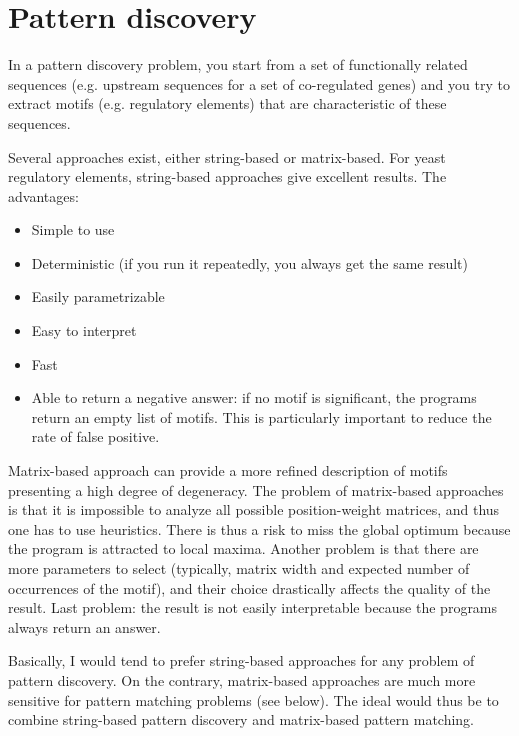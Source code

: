 \chapter{Pattern discovery}

In a pattern discovery problem, you start from a set of
functionally related sequences (e.g.  upstream sequences for a set of
co-regulated genes) and you try to extract motifs (e.g. regulatory
elements) that are characteristic of these sequences.

Several approaches exist, either string-based or matrix-based. For
yeast regulatory elements, string-based approaches give excellent
results. The advantages:

\begin{itemize}
\item Simple to use
\item Deterministic (if you run it repeatedly, you always get the same result)
\item Easily parametrizable
\item Easy to interpret
\item Fast
\item Able to return a negative answer: if no motif is significant,
the programs return an empty list of motifs. This is particularly
important to reduce the rate of false positive.
\end{itemize}

Matrix-based approach can provide a more refined description of motifs
presenting a high degree of degeneracy. The problem of matrix-based
approaches is that it is impossible to analyze all possible
position-weight matrices, and thus one has to use heuristics. There is
thus a risk to miss the global optimum because the program is
attracted to local maxima. Another problem is that there are more
parameters to select (typically, matrix width and expected number of
occurrences of the motif), and their choice drastically affects the
quality of the result. Last problem: the result is not easily
interpretable because the programs always return an answer.

Basically, I would tend to prefer string-based approaches for any
problem of pattern discovery. On the contrary, matrix-based approaches
are much more sensitive for pattern matching problems (see below). The
ideal would thus be to combine string-based pattern discovery and
matrix-based pattern matching.

